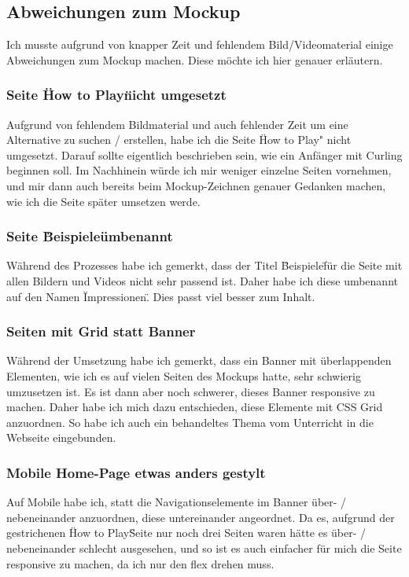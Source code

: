 \documentclass[11pt]{article}
\begin{document}
    \subsection{Abweichungen zum Mockup}
    Ich musste aufgrund von knapper Zeit und fehlendem Bild/Videomaterial einige Abweichungen zum Mockup machen. Diese möchte ich hier genauer erläutern.

    \subsubsection{Seite \"How to Play\" nicht umgesetzt}
    Aufgrund von fehlendem Bildmaterial und auch fehlender Zeit um eine Alternative zu suchen / erstellen, habe ich die Seite \"How to Play" nicht umgesetzt.
    Darauf sollte eigentlich beschrieben sein, wie ein Anfänger mit Curling beginnen soll. Im Nachhinein würde ich mir weniger einzelne Seiten vornehmen, und
    mir dann auch bereits beim Mockup-Zeichnen genauer Gedanken machen, wie ich die Seite später umsetzen werde.

    \subsubsection{Seite \"Beispiele\" umbenannt}
    Während des Prozesses habe ich gemerkt, dass der Titel \"Beispiele\" für die Seite mit allen Bildern und Videos nicht sehr passend ist. Daher habe ich
    diese umbenannt auf den Namen \"Impressionen\". Dies passt viel besser zum Inhalt.

    \subsubsection{Seiten mit Grid statt Banner}
    Während der Umsetzung habe ich gemerkt, dass ein Banner mit überlappenden Elementen, wie ich es auf vielen Seiten des Mockups hatte, sehr
    schwierig umzusetzen ist. Es ist dann aber noch schwerer, dieses Banner responsive zu machen. Daher habe ich mich dazu entschieden,
    diese Elemente mit CSS Grid anzuordnen. So habe ich auch ein behandeltes Thema vom Unterricht in die Webseite eingebunden.

    \subsubsection{Mobile Home-Page etwas anders gestylt}
    Auf Mobile habe ich, statt die Navigationselemente im Banner über- / nebeneinander anzuordnen, diese untereinander angeordnet. Da es, aufgrund
    der gestrichenen \"How to Play\" Seite nur noch drei Seiten waren hätte es über- / nebeneinander schlecht ausgesehen, und so ist es auch
    einfacher für mich die Seite responsive zu machen, da ich nur den flex drehen muss.
\end{document}

